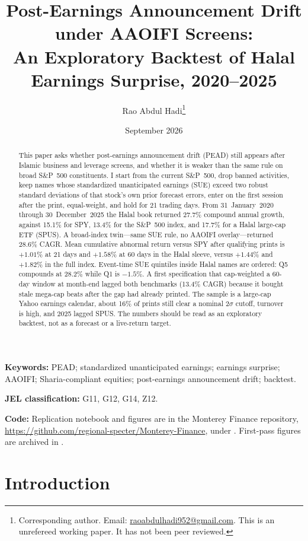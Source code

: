 \documentclass[11pt,letterpaper]{article}
\title{\textbf{Post-Earnings Announcement Drift under AAOIFI Screens:\\
An Exploratory Backtest of Halal Earnings Surprise, 2020--2025}}
\author[1]{Rao Abdul Hadi\thanks{Corresponding author. Email: \href{mailto:raoabdulhadi952@gmail.com}{raoabdulhadi952@gmail.com}. This is an unrefereed working paper. It has not been peer reviewed.}}
\affil[1]{Monterey Finance, Halal Quant Research Lab}
\date{September 2026}
\begin{document}
\maketitle

\begin{abstract}
\noindent
This paper asks whether post-earnings announcement drift (PEAD) still appears after Islamic business and leverage screens, and whether it is weaker than the same rule on broad S\&P~500 constituents. I start from the current S\&P~500, drop banned activities, keep names whose standardized unanticipated earnings (SUE) exceed two robust standard deviations of that stock's own prior forecast errors, enter on the first session after the print, equal-weight, and hold for 21 trading days. From 31~January~2020 through 30~December~2025 the Halal book returned 27.7\% compound annual growth, against 15.1\% for SPY, 13.4\% for the S\&P~500 index, and 17.7\% for a Halal large-cap ETF (SPUS). A broad-index twin---same SUE rule, no AAOIFI overlay---returned 28.6\% CAGR. Mean cumulative abnormal return versus SPY after qualifying prints is $+1.01\%$ at 21 days and $+1.58\%$ at 60 days in the Halal sleeve, versus $+1.44\%$ and $+1.82\%$ in the full index. Event-time SUE quintiles inside Halal names are ordered: Q5 compounds at 28.2\% while Q1 is $-1.5\%$. A first specification that cap-weighted a 60-day window at month-end lagged both benchmarks (13.4\% CAGR) because it bought stale mega-cap beats after the gap had already printed. The sample is a large-cap Yahoo earnings calendar, about 16\% of prints still clear a nominal $2\sigma$ cutoff, turnover is high, and 2025 lagged SPUS. The numbers should be read as an exploratory backtest, not as a forecast or a live-return target.
\end{abstract}

\noindent\textbf{Keywords:}
PEAD; standardized unanticipated earnings; earnings surprise; AAOIFI; Sharia-compliant equities; post-earnings announcement drift; backtest.

\noindent\textbf{JEL classification:} G11, G12, G14, Z12.

\noindent\textbf{Code:}
Replication notebook and figures are in the Monterey Finance repository,
\url{https://github.com/regional-specter/Monterey-Finance},
under .
First-pass figures are archived in .

\section{Introduction}
\end{document}
